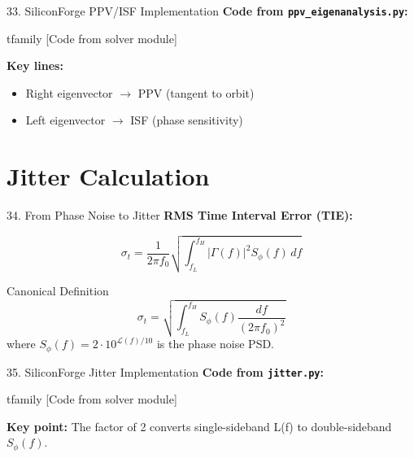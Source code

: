 \documentclass[aspectratio=169, 11pt]{beamer}
\begin{document}
\begin{frame}{33. SiliconForge PPV/ISF Implementation}
    \textbf{Code from \texttt{ppv\_eigenanalysis.py}:}

    \vspace{0.5em}
    {	tfamily [Code from solver module]}

    \vspace{0.5em}
    \textbf{Key lines:}
    \begin{itemize}
        \item Right eigenvector $\rightarrow$ PPV (tangent to orbit)
        \item Left eigenvector $\rightarrow$ ISF (phase sensitivity)
    \end{itemize}
\end{frame}


\section{Jitter Calculation}

\begin{frame}{34. From Phase Noise to Jitter}
    \textbf{RMS Time Interval Error (TIE):}

    \vspace{0.5em}
    \[ \sigma_t = \frac{1}{2\pi f_0} \sqrt{\int_{f_L}^{f_H} |\Gamma(f)|^2 S_\phi(f) \, df} \]

    \vspace{0.5em}
    \begin{block}{Canonical Definition}
        \[ \sigma_t = \sqrt{\int_{f_L}^{f_H} S_\phi(f) \frac{df}{(2\pi f_0)^2}} \]
        where $S_\phi(f) = 2 \cdot 10^{\mathcal{L}(f)/10}$ is the phase noise PSD.
    \end{block}
\end{frame}

\begin{frame}{35. SiliconForge Jitter Implementation}
    \textbf{Code from \texttt{jitter.py}:}

    \vspace{0.5em}
    {	tfamily [Code from solver module]}

    \vspace{0.5em}
    \textbf{Key point:} The factor of 2 converts single-sideband L(f) to double-sideband $S_\phi(f)$.
\end{frame}
\end{document}
